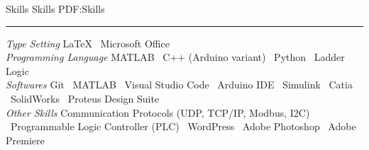 \documentclass[letterpaper,MMMyyyy]{ResumeTemplate}
\begin{document}
\begin{Body}
\Section
{Skills}
{Skills}
{PDF:Skills}
\textcolor{Forestg}{\vspace{0.05cm}\hrule height 0.1cm}\BigGap
\BulletItem
\textit{Type Setting}
\newline
{\LaTeX} \textbullet\ Microsoft Office
\\
\vspace{5pt}
\BulletItem
\textit{Programming Language}
\newline
MATLAB \textbullet\ 
C++ (Arduino variant) \textbullet\ 
Python \textbullet\ 
Ladder Logic
\\
\vspace{5pt}
\BulletItem
\textit{Softwares}
\newline
Git \textbullet\
MATLAB \textbullet\ 
Visual Studio Code \textbullet\ 
Arduino IDE \textbullet\ 
Simulink \textbullet\ 
Catia \textbullet\
SolidWorks \textbullet\
Proteus Design Suite\\
\vspace{5pt}
\BulletItem
\textit{Other Skills}
\newline
Communication Protocols (UDP, TCP/IP, Modbus, I2C) 
\textbullet\ Programmable Logic Controller (PLC)
\textbullet\ WordPress 
\textbullet\ Adobe Photoshop 
\textbullet\ Adobe Premiere 


\end{Body}
\end{document}
